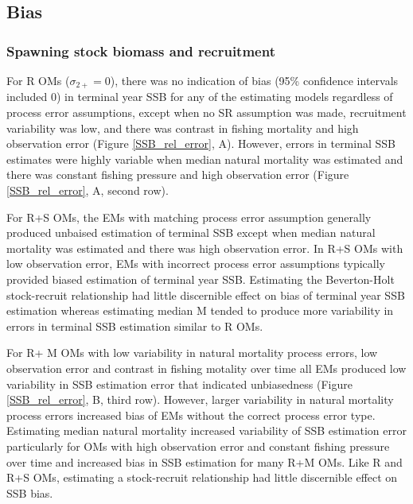 \documentclass[
  12pt,
]{article}
\begin{document}
\hypertarget{bias-1}{%
\subsection*{Bias}\label{bias-1}}

\hypertarget{spawning-stock-biomass-and-recruitment}{%
\subsubsection*{Spawning stock biomass and
recruitment}\label{spawning-stock-biomass-and-recruitment}}

For R OMs (\(\sigma_{2+} = 0\)), there was no indication of bias (95\%
confidence intervals included 0) in terminal year SSB for any of the
estimating models regardless of process error assumptions, except when
no SR assumption was made, recruitment variability was low, and there
was contrast in fishing mortality and high observation error (Figure
\ref{SSB_rel_error}, A). However, errors in terminal SSB estimates were
highly variable when median natural mortality was estimated and there
was constant fishing pressure and high observation error (Figure
\ref{SSB_rel_error}, A, second row).

For R+S OMs, the EMs with matching process error assumption generally
produced unbaised estimation of terminal SSB except when median natural
mortality was estimated and there was high observation error. In R+S OMs
with low observation error, EMs with incorrect process error assumptions
typically provided biased estimation of terminal year SSB. Estimating
the Beverton-Holt stock-recruit relationship had little discernible
effect on bias of terminal year SSB estimation whereas estimating median
M tended to produce more variability in errors in terminal SSB
estimation similar to R OMs.

For R+ M OMs with low variability in natural mortality process errors,
low observation error and contrast in fishing motality over time all EMs
produced low variability in SSB estimation error that indicated
unbiasedness (Figure \ref{SSB_rel_error}, B, third row). However, larger
variability in natural mortality process errors increased bias of EMs
without the correct process error type. Estimating median natural
mortality increased variability of SSB estimation error particularly for
OMs with high observation error and constant fishing pressure over time
and increased bias in SSB estimation for many R+M OMs. Like R and R+S
OMs, estimating a stock-recruit relationship had little discernible
effect on SSB bias.
\end{document}
